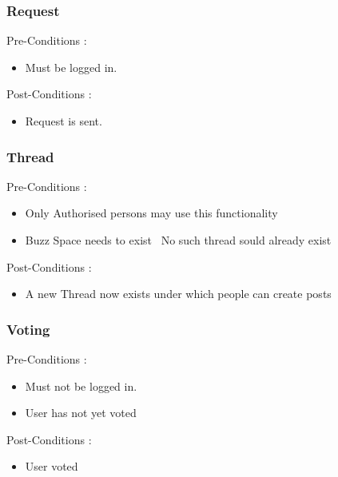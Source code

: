 \documentclass[12pt, oneside]{article}
\begin{document}
			\subsubsection{Request}
				Pre-Conditions : \begin{itemize}
							\item Must be logged in.
						     \end{itemize}
				Post-Conditions : \begin{itemize}
							\item Request is sent.
						     \end{itemize}
			\subsubsection{Thread}
				Pre-Conditions : \begin{itemize}
							\item Only Authorised persons may use this functionality
							\item Buzz Space needs to exist 
							\ No such thread sould already exist
						     \end{itemize}
				Post-Conditions : \begin{itemize}
							\item A new Thread now exists under which people can create posts
						     \end{itemize}
			\subsubsection{Voting}
				Pre-Conditions : \begin{itemize}
							\item Must not be logged in.
							\item User has not yet voted
						     \end{itemize}
				Post-Conditions : \begin{itemize}
							\item User voted
						     \end{itemize}	
\end{document}
